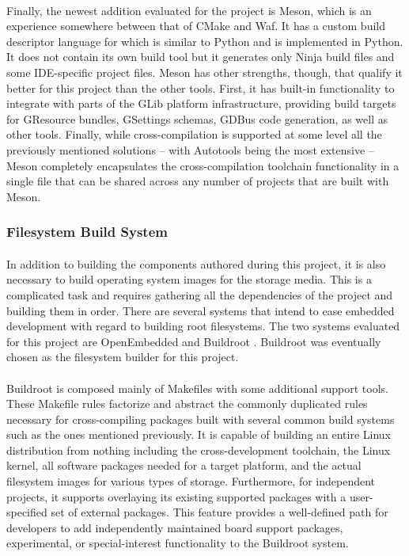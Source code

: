 \paragraph{}
Finally, the newest addition evaluated for the project is Meson, which is an experience somewhere between that of CMake and Waf.
It has a custom build descriptor language for which is similar to Python and is implemented in Python.
It does not contain its own build tool but it generates only Ninja build files and some IDE-specific project files.
Meson has other strengths, though, that qualify it better for this project than the other tools.
First, it has built-in functionality to integrate with parts of the GLib platform infrastructure, providing build targets for GResource bundles, GSettings schemas, GDBus code generation, as well as other tools.
Finally, while cross-compilation is supported at some level all the previously mentioned solutions -- with Autotools being the most extensive -- Meson completely encapsulates the cross-compilation toolchain functionality in a single file that can be shared across any number of projects that are built with Meson.

\subsubsection{Filesystem Build System}

\paragraph{}
In addition to building the components authored during this project, it is also necessary to build operating system images for the storage media.
This is a complicated task and requires gathering all the dependencies of the project and building them in order.
There are several systems that intend to ease embedded development with regard to building root filesystems.
The two systems evaluated for this project are OpenEmbedded \cite{oe-home} and Buildroot \cite{buildroot-home}.
Buildroot was eventually chosen as the filesystem builder for this project.

\paragraph{}
Buildroot is composed mainly of Makefiles with some additional support tools.
These Makefile rules factorize and abstract the commonly duplicated rules necessary for cross-compiling packages built with several common build systems such as the ones mentioned previously.
It is capable of building an entire Linux distribution from nothing including the cross-development toolchain, the Linux kernel, all software packages needed for a target platform, and the actual filesystem images for various types of storage.
Furthermore, for independent projects, it supports overlaying its existing supported packages with a user-specified set of external packages.
This feature provides a well-defined path for developers to add independently maintained board support packages, experimental, or special-interest functionality to the Buildroot system.

